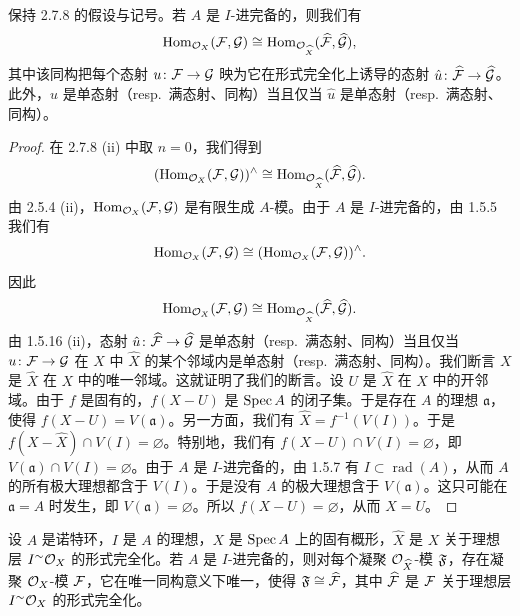 \begin{corollary}\label{it:2.7.9}
保持 2.7.8 的假设与记号。若 $A$ 是 $I$-进完备的，则我们有
\begin{equation*}
\operatorname{Hom}_{\mathcal{O}_X}(\mathcal{F},\mathcal{G})\cong\operatorname{Hom}_{\mathcal{O}_{\widehat{X}}}(\widehat{\mathcal{F}},\widehat{\mathcal{G}}),
\end{equation*}
其中该同构把每个态射 $u\colon\mathcal{F}\to\mathcal{G}$ 映为它在形式完全化上诱导的态射 $\hat{u}\colon\widehat{\mathcal{F}}\to\widehat{\mathcal{G}}$。此外，$u$ 是单态射（resp.\ 满态射、同构）当且仅当 $\hat{u}$ 是单态射（resp.\ 满态射、同构）。
\end{corollary}

\begin{proof}
在 2.7.8 (ii) 中取 $n=0$，我们得到
\begin{equation*}
(\operatorname{Hom}_{\mathcal{O}_X}(\mathcal{F},\mathcal{G}))^{\wedge}\cong\operatorname{Hom}_{\mathcal{O}_{\widehat{X}}}(\widehat{\mathcal{F}},\widehat{\mathcal{G}}).
\end{equation*}
由 2.5.4 (ii)，$\operatorname{Hom}_{\mathcal{O}_X}(\mathcal{F},\mathcal{G})$ 是有限生成 $A$-模。由于 $A$ 是 $I$-进完备的，由 1.5.5 我们有
\begin{equation*}
\operatorname{Hom}_{\mathcal{O}_X}(\mathcal{F},\mathcal{G})\cong(\operatorname{Hom}_{\mathcal{O}_X}(\mathcal{F},\mathcal{G}))^{\wedge}.
\end{equation*}
因此
\begin{equation*}
\operatorname{Hom}_{\mathcal{O}_X}(\mathcal{F},\mathcal{G})\cong\operatorname{Hom}_{\mathcal{O}_{\widehat{X}}}(\widehat{\mathcal{F}},\widehat{\mathcal{G}}).
\end{equation*}
由 1.5.16 (ii)，态射 $\hat{u}\colon\widehat{\mathcal{F}}\to\widehat{\mathcal{G}}$ 是单态射（resp.\ 满态射、同构）当且仅当 $u\colon\mathcal{F}\to\mathcal{G}$ 在 $X$ 中 $\widehat{X}$ 的某个邻域内是单态射（resp.\ 满态射、同构）。我们断言 $X$ 是 $\widehat{X}$ 在 $X$ 中的唯一邻域。这就证明了我们的断言。设 $U$ 是 $\widehat{X}$ 在 $X$ 中的开邻域。由于 $f$ 是固有的，$f(X-U)$ 是 $\operatorname{Spec} A$ 的闭子集。于是存在 $A$ 的理想 $\mathfrak{a}$，使得 $f(X-U)=V(\mathfrak{a})$。另一方面，我们有 $\widehat{X}=f^{-1}(V(I))$。于是 $f(X-\widehat{X})\cap V(I)=\varnothing$。特别地，我们有 $f(X-U)\cap V(I)=\varnothing$，即 $V(\mathfrak{a})\cap V(I)=\varnothing$。由于 $A$ 是 $I$-进完备的，由 1.5.7 有 $I\subset\operatorname{rad}(A)$，从而 $A$ 的所有极大理想都含于 $V(I)$。于是没有 $A$ 的极大理想含于 $V(\mathfrak{a})$。这只可能在 $\mathfrak{a}=A$ 时发生，即 $V(\mathfrak{a})=\varnothing$。所以 $f(X-U)=\varnothing$，从而 $X=U$。
\end{proof}

\begin{theorem}\label{it:2.7.10}
设 $A$ 是诺特环，$I$ 是 $A$ 的理想，$X$ 是 $\operatorname{Spec} A$ 上的固有概形，$\widehat{X}$ 是 $X$ 关于理想层 $I^{\sim}\mathcal{O}_X$ 的形式完全化。若 $A$ 是 $I$-进完备的，则对每个凝聚 $\mathcal{O}_{\widehat{X}}$-模 $\mathfrak{F}$，存在凝聚 $\mathcal{O}_X$-模 $\mathcal{F}$，它在唯一同构意义下唯一，使得 $\mathfrak{F}\cong\widehat{\mathcal{F}}$，其中 $\widehat{\mathcal{F}}$ 是 $\mathcal{F}$ 关于理想层 $I^{\sim}\mathcal{O}_X$ 的形式完全化。
\end{theorem}

